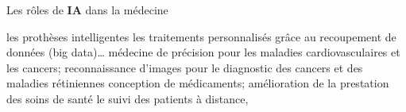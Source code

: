 \begin{frame}{Les rôles de \textbf{IA} dans la médecine}
    \begin{enumerate}[<+-|alert@+>]
        \myitem les prothèses intelligentes
        \myitem les traitements personnalisés grâce au recoupement de données (big data)… 
        \myitem médecine de précision pour les maladies cardiovasculaires et les cancers;
        \myitem reconnaissance d'images pour le diagnostic des cancers et des maladies rétiniennes conception de médicaments;
        \myitem amélioration de la prestation des soins de santé
        \myitem le suivi des patients à distance,
    \end{enumerate}
    \vspace{80mm}
\end{frame}

